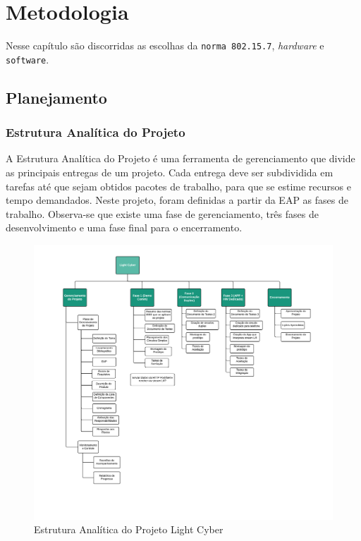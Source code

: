 	\chapter{Metodologia}\label{cap-metodologia}
	
	Nesse capítulo são discorridas as escolhas da \texttt{norma 802.15.7}, \textit{hardware} e \texttt{software}.
	
	\section{Planejamento}\label{sec-planejamento}
	
	\subsection{Estrutura Analítica do Projeto}\label{subsec-eap}
	
	A Estrutura Analítica do Projeto é uma ferramenta de gerenciamento que divide as principais entregas de um projeto. Cada entrega deve ser subdividida em tarefas até que sejam obtidos pacotes de trabalho, para que se estime recursos e tempo demandados. Neste projeto, foram definidas a partir da EAP as fases de trabalho. Observa-se que existe uma fase de gerenciamento, três fases de desenvolvimento e uma fase final para o encerramento.
	
	
	\begin{figure}[htb]
		\caption{\label{fig_eap} Estrutura Analítica do Projeto Light Cyber }
		\centering
			\includegraphics[width=1.0\textwidth, trim={1cm 1cm 1cm 1cm}, clip]{EAP.pdf}
	\end{figure}
	
